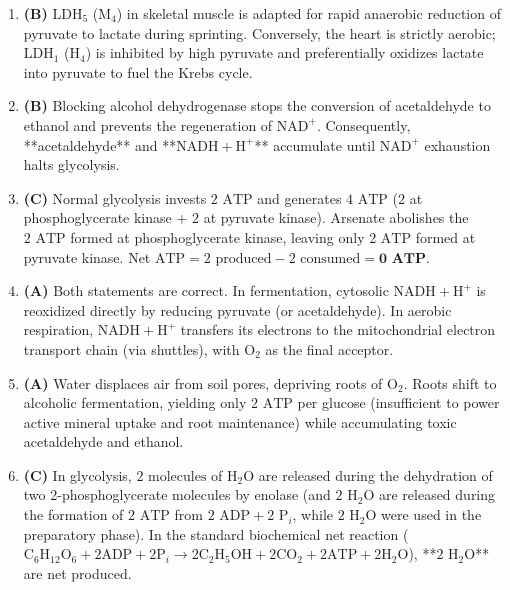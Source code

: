 \documentclass[11pt, a4paper]{article}
\begin{document}
\begin{enumerate}[label=\textbf{\arabic*.}]
\item \textbf{(B)} $\text{LDH}_5$ ($\text{M}_4$) in skeletal muscle is adapted for rapid anaerobic reduction of pyruvate to lactate during sprinting. Conversely, the heart is strictly aerobic; $\text{LDH}_1$ ($\text{H}_4$) is inhibited by high pyruvate and preferentially oxidizes lactate into pyruvate to fuel the Krebs cycle.

\item \textbf{(B)} Blocking alcohol dehydrogenase stops the conversion of acetaldehyde to ethanol and prevents the regeneration of $\text{NAD}^+$. Consequently, **acetaldehyde** and **$\text{NADH} + \text{H}^+$** accumulate until $\text{NAD}^+$ exhaustion halts glycolysis.

\item \textbf{(C)} Normal glycolysis invests $2\text{ ATP}$ and generates $4\text{ ATP}$ ($2$ at phosphoglycerate kinase + $2$ at pyruvate kinase). Arsenate abolishes the $2\text{ ATP}$ formed at phosphoglycerate kinase, leaving only $2\text{ ATP}$ formed at pyruvate kinase. Net $\text{ATP} = 2\text{ produced} - 2\text{ consumed} = \mathbf{0\text{ ATP}}$.

\item \textbf{(A)} Both statements are correct. In fermentation, cytosolic $\text{NADH} + \text{H}^+$ is reoxidized directly by reducing pyruvate (or acetaldehyde). In aerobic respiration, $\text{NADH} + \text{H}^+$ transfers its electrons to the mitochondrial electron transport chain (via shuttles), with $\text{O}_2$ as the final acceptor.

\item \textbf{(A)} Water displaces air from soil pores, depriving roots of $\text{O}_2$. Roots shift to alcoholic fermentation, yielding only $2\text{ ATP}$ per glucose (insufficient to power active mineral uptake and root maintenance) while accumulating toxic acetaldehyde and ethanol.

\item \textbf{(C)} In glycolysis, $2\text{ molecules}$ of $\text{H}_2\text{O}$ are released during the dehydration of two 2-phosphoglycerate molecules by enolase (and $2\text{ H}_2\text{O}$ are released during the formation of $2\text{ ATP}$ from $2\text{ ADP} + 2\text{ P}_i$, while $2\text{ H}_2\text{O}$ were used in the preparatory phase). In the standard biochemical net reaction ($\text{C}_6\text{H}_{12}\text{O}_6 + 2\text{ADP} + 2\text{P}_i \rightarrow 2\text{C}_2\text{H}_5\text{OH} + 2\text{CO}_2 + 2\text{ATP} + 2\text{H}_2\text{O}$), **$2\text{ H}_2\text{O}$** are net produced.


\end{enumerate}
\end{document}

